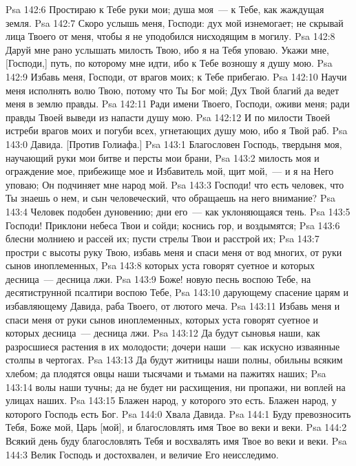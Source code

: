 \vs Psa 142:6 Простираю к Тебе руки мои; душа моя~--- к Тебе, как жаждущая земля.
\vs Psa 142:7 Скоро услышь меня, Господи: дух мой изнемогает; не скрывай лица Твоего от меня, чтобы я не уподобился нисходящим в могилу.
\vs Psa 142:8 Даруй мне рано услышать милость Твою, ибо я на Тебя уповаю. Укажи мне, [Господи,] путь, по которому мне идти, ибо к Тебе возношу я душу мою.
\vs Psa 142:9 Избавь меня, Господи, от врагов моих; к Тебе прибегаю.
\vs Psa 142:10 Научи меня исполнять волю Твою, потому что Ты Бог мой; Дух Твой благий да ведет меня в землю правды.
\vs Psa 142:11 Ради имени Твоего, Господи, оживи меня; ради правды Твоей выведи из напасти душу мою.
\vs Psa 142:12 И по милости Твоей истреби врагов моих и погуби всех, угнетающих душу мою, ибо я Твой раб.
\vs Psa 143:0 Давида. [Против Голиафа.]
\rsbpar\vs Psa 143:1 Благословен Господь, твердыня моя, научающий руки мои битве и персты мои брани,
\vs Psa 143:2 милость моя и ограждение мое, прибежище мое и Избавитель мой, щит мой,~--- и я на Него уповаю; Он подчиняет мне народ мой.
\vs Psa 143:3 Господи! что есть человек, что Ты знаешь о нем, и сын человеческий, что обращаешь на него внимание?
\vs Psa 143:4 Человек подобен дуновению; дни его~--- как уклоняющаяся тень.
\vs Psa 143:5 Господи! Приклони небеса Твои и сойди; коснись гор, и воздымятся;
\vs Psa 143:6 блесни молниею и рассей их; пусти стрелы Твои и расстрой их;
\vs Psa 143:7 простри с высоты руку Твою, избавь меня и спаси меня от вод многих, от руки сынов иноплеменных,
\vs Psa 143:8 которых уста говорят суетное и которых десница~--- десница лжи.
\vs Psa 143:9 Боже! новую песнь воспою Тебе, на десятиструнной псалтири воспою Тебе,
\vs Psa 143:10 дарующему спасение царям и избавляющему Давида, раба Твоего, от лютого меча.
\vs Psa 143:11 Избавь меня и спаси меня от руки сынов иноплеменных, которых уста говорят суетное и которых десница~--- десница лжи.
\vs Psa 143:12 Да будут сыновья наши, как разросшиеся растения в их молодости; дочери наши~--- как искусно изваянные столпы в чертогах.
\vs Psa 143:13 Да будут житницы наши полны, обильны всяким хлебом; да плодятся овцы наши тысячами и тьмами на пажитях наших;
\vs Psa 143:14  волы наши тучны; да не будет ни расхищения, ни пропажи, ни воплей на улицах наших.
\vs Psa 143:15 Блажен народ, у которого это есть. Блажен народ, у которого Господь есть Бог.
\vs Psa 144:0 Хвала Давида.
\rsbpar\vs Psa 144:1 Буду превозносить Тебя, Боже мой, Царь [мой], и благословлять имя Твое во веки и веки.
\vs Psa 144:2 Всякий день буду благословлять Тебя и восхвалять имя Твое во веки и веки.
\vs Psa 144:3 Велик Господь и достохвален, и величие Его неисследимо.
